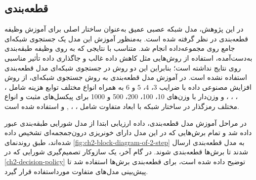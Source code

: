 \begin{table}[h]
\centering
\caption{ضرایب مورد استفاده در جستجوی شبکه‌ای}
\label{table:ch2-grid-values}
\end{table}

\subsection{قطعه‌بندی}
در این پژوهش،‌ مدل شبکه عصبی عمیق 
به‌عنوان ساختار اصلی برای آموزش وظیفه قطعه‌بندی در نظر گرفته شده است. به‌منظور آموزش این مدل یک جستجوی شبکه‌ای جامع روی مجموعه‌داده انجام شد. متناسب با نتایجی که به روی وظیفه طبقه‌بندی به‌دست‌آمده، استفاده از روش‌هایی مثل کاهش داده غالب و جاگذاری داده تأثیر  مناسبی روی نتایج نداشته است؛ بنابراین این دو روش در جستجوی شبکه‌ای مدل قطعه‌بندی استفاده نشده است. در آموزش مدل قطعه‌بندی به روش جستجوی شبکه‌ای، از روش افزایش مصنوعی داده با ضرایب 
$3$، $4$، $5$ و $6$
به همراه انواع مختلف توابع هزینه شامل 
، ، ، ،   و
وزن‌دار با وزن‌های 10، 100،‌ 200، 500 و 1000 برای پیکسل‌های مثبت و انواع مختلف رمزگذار در ساختار شبکه 
با ابعاد متفاوت شامل 
، ، , 
و 
استفاده شده است.

در مراحل آموزش مدل قطعه‌بندی، داده ارزیابی ابتدا از مدل شورایی طبقه‌بندی عبور داده شد و تمام برش‌هایی که در این مدل دارای خونریزی درون‌جمجمه‌ای تشخیص داده شده‌اند،‌ طبق روندنمای 
\autoref{fig:ch2-block-diagram-of-2-step}
به مدل قطعه‌بندی ارسال شدند تا برش‌ها قطعه‌بندی شوند.
در گام آخر، یک سازوکار تصمیم‌گیری شورایی که در 
\autoref{ch2-decision-policy}
توضیح داده شده است، 
برای قطعه‌بندی برش‌ها استفاده شد تا پیش‌بینی مدل‌های متفاوت مورداستفاده قرار گیرد.



